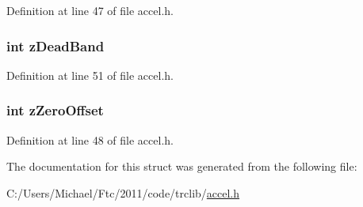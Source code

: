 Definition at line 47 of file accel.h.

\hypertarget{struct_a_c_c_e_l_a3aa860d734149d6bee92a76050890c67}{
\subsubsection[{zDeadBand}]{\setlength{\rightskip}{0pt plus 5cm}int {\bf zDeadBand}}}
\label{struct_a_c_c_e_l_a3aa860d734149d6bee92a76050890c67}


Definition at line 51 of file accel.h.

\hypertarget{struct_a_c_c_e_l_a28849c67acd5ce8dfbee6d408e3ebc04}{
\subsubsection[{zZeroOffset}]{\setlength{\rightskip}{0pt plus 5cm}int {\bf zZeroOffset}}}
\label{struct_a_c_c_e_l_a28849c67acd5ce8dfbee6d408e3ebc04}


Definition at line 48 of file accel.h.



The documentation for this struct was generated from the following file:\begin{DoxyCompactItemize}
\item 
C:/Users/Michael/Ftc/2011/code/trclib/\hyperlink{accel_8h}{accel.h}\end{DoxyCompactItemize}
